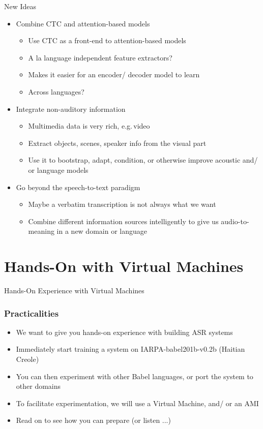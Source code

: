 \begin{frame}{New Ideas}
  \begin{itemize}
  \item Combine CTC and attention-based models
    \begin{itemize}
    \item Use CTC as a front-end to attention-based models
    \item A la language independent feature extractors?
    \item Makes it easier for an encoder/ decoder model to learn
    \item Across languages?
    \end{itemize}
  \item Integrate non-auditory information
    \begin{itemize}
    \item Multimedia data is very rich, e.g.\,video
    \item Extract objects, scenes, speaker info from the visual part
    \item Use it to bootstrap, adapt, condition, or otherwise improve acoustic and/ or language models
    \end{itemize}
  \item Go beyond the speech-to-text paradigm
    \begin{itemize}
    \item Maybe a verbatim transcription is not always what we want
    \item Combine different information sources intelligently to give us audio-to-meaning in a new domain or language
    \end{itemize}
  \end{itemize}
\end{frame}


\section{Hands-On with Virtual Machines}

\begin{frame}
  \begin{center}
    {\color{Maroon}\Huge Hands-On Experience with Virtual Machines\par}
  \end{center}
\end{frame}

\begin{frame}
  \frametitle{Practicalities}
  \begin{itemize}
  \item We want to give you hands-on experience with building ASR systems
  \item Immediately start training a system on IARPA-babel201b-v0.2b (Haitian Creole)
  \item You can then experiment with other Babel languages, or port the system to other domains
  \item To facilitate experimentation, we will use a Virtual Machine, and/ or an AMI
  \item {\color{Maroon}Read on to see how you can prepare (or listen ...)}
  \end{itemize}
\end{frame}

